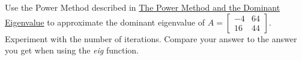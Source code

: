 \documentclass{ximera}
\begin{document}
\begin{problem}\label{prob_oct_eig4}
    Use the Power Method described in \href{https://ximera.osu.edu/linearalgebradzv3/LinearAlgebraInteractiveIntro/EIG-0070/main}{The Power Method and the Dominant Eigenvalue} to approximate the dominant eigenvalue of 
    $A=\begin{bmatrix}-4 & 64\\ 16 & 44\end{bmatrix}$.  Experiment with the number of iterations.  Compare your answer to the answer you get when using the \emph{eig} function.
\end{problem}
 
\end{document}
